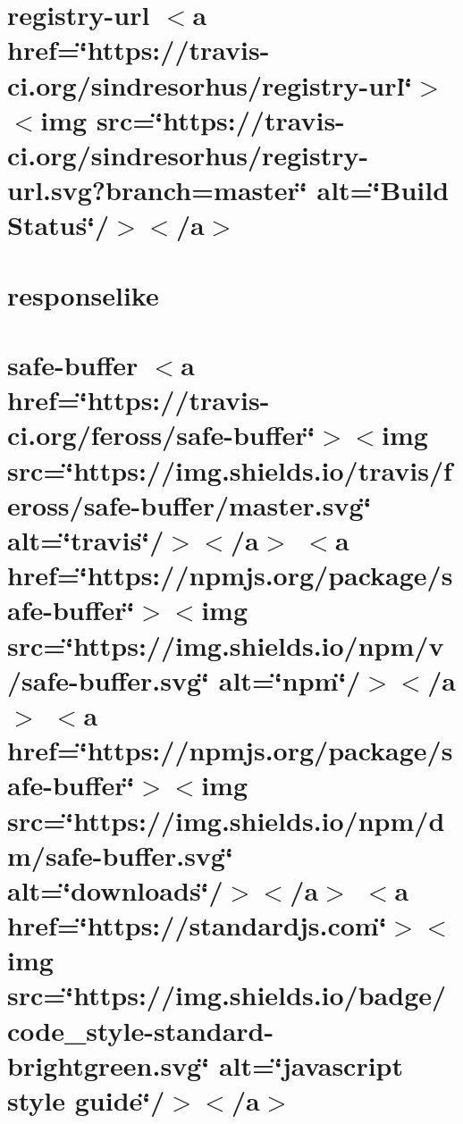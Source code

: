 \let\mypdfximage\pdfximage\def\pdfximage{\immediate\mypdfximage}\documentclass[twoside]{book}
\newcommand{\+}{\discretionary{\mbox{\scriptsize$\hookleftarrow$}}{}{}}
\begin{document}
\chapter{registry-\/url $<$a href=\char`\"{}https\+://travis-\/ci.\+org/sindresorhus/registry-\/url\char`\"{}$>$$<$img src=\char`\"{}https\+://travis-\/ci.\+org/sindresorhus/registry-\/url.\+svg?branch=master\char`\"{} alt=\char`\"{}\+Build Status\char`\"{}/$>$$<$/a$>$}
\label{md__c_1__git_hub__p_r_o_y_e_c_t_o-_i_i_i-_g_o_t_rest-api-node-mysql_node_modules_registry-url_readme}

\chapter{responselike}
\label{md__c_1__git_hub__p_r_o_y_e_c_t_o-_i_i_i-_g_o_t_rest-api-node-mysql_node_modules_responselike__r_e_a_d_m_e}

\chapter{safe-\/buffer $<$a href=\char`\"{}https\+://travis-\/ci.\+org/feross/safe-\/buffer\char`\"{}$>$$<$img src=\char`\"{}https\+://img.\+shields.\+io/travis/feross/safe-\/buffer/master.\+svg\char`\"{} alt=\char`\"{}travis\char`\"{}/$>$$<$/a$>$ $<$a href=\char`\"{}https\+://npmjs.\+org/package/safe-\/buffer\char`\"{}$>$$<$img src=\char`\"{}https\+://img.\+shields.\+io/npm/v/safe-\/buffer.\+svg\char`\"{} alt=\char`\"{}npm\char`\"{}/$>$$<$/a$>$ $<$a href=\char`\"{}https\+://npmjs.\+org/package/safe-\/buffer\char`\"{}$>$$<$img src=\char`\"{}https\+://img.\+shields.\+io/npm/dm/safe-\/buffer.\+svg\char`\"{} alt=\char`\"{}downloads\char`\"{}/$>$$<$/a$>$ $<$a href=\char`\"{}https\+://standardjs.\+com\char`\"{}$>$$<$img src=\char`\"{}https\+://img.\+shields.\+io/badge/code\+\_\+style-\/standard-\/brightgreen.\+svg\char`\"{} alt=\char`\"{}javascript style guide\char`\"{}/$>$$<$/a$>$}
\label{md__c_1__git_hub__p_r_o_y_e_c_t_o-_i_i_i-_g_o_t_rest-api-node-mysql_node_modules_safe-buffer__r_e_a_d_m_e}

\end{document}

